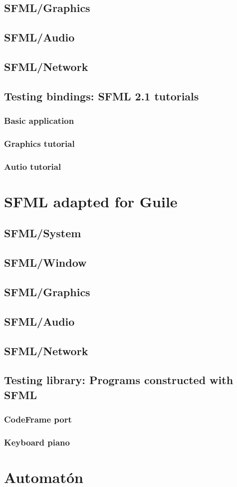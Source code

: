 \documentclass[latterpaper, leqno]{article}
\begin{document}
\subsection{SFML/Graphics}
\subsection{SFML/Audio}
\subsection{SFML/Network}
\subsection{Testing bindings: SFML 2.1 tutorials}
\subsubsection*{Basic application}
\subsubsection*{Graphics tutorial}
\subsubsection*{Autio tutorial}

\section{SFML adapted for Guile}
\subsection{SFML/System}
\subsection{SFML/Window}
\subsection{SFML/Graphics}
\subsection{SFML/Audio}
\subsection{SFML/Network}
\subsection{Testing library: Programs constructed with SFML}
\subsubsection*{CodeFrame port}
\subsubsection*{Keyboard piano}

\section{Automatón}
\end{document}

